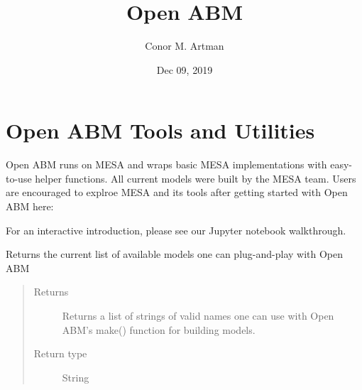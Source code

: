 \documentclass[letterpaper,10pt,english]{sphinxmanual}
\title{Open ABM}
\date{Dec 09, 2019}
\author{Conor M.\@{} Artman}
\begin{document}
\pagestyle{empty}
\sphinxmaketitle
\pagestyle{plain}
\sphinxtableofcontents
\pagestyle{normal}
\label{\detokenize{index::doc}}

\label{\detokenize{index:module-oabm_tools}}

\chapter{Open ABM Tools and Utilities}
\label{\detokenize{index:open-abm-tools-and-utilities}}
Open ABM runs on MESA and wraps basic MESA implementations with easy-to-use helper functions.
All current models were built by the MESA team. Users are encouraged to explroe MESA
and its tools after getting started with Open ABM here: 

For an interactive introduction, please see our Jupyter notebook walkthrough.

\begin{fulllineitems}
\label{\detokenize{index:oabm_tools.check_models}}
Returns the current list of available models one can plug-and-play with Open ABM
\begin{quote}\begin{description}
\item[{Returns}] \leavevmode
Returns a list of strings of valid names one can use with Open ABM’s make() function for building models.

\item[{Return type}] \leavevmode
String

\end{description}\end{quote}

\end{fulllineitems}

\end{document}
